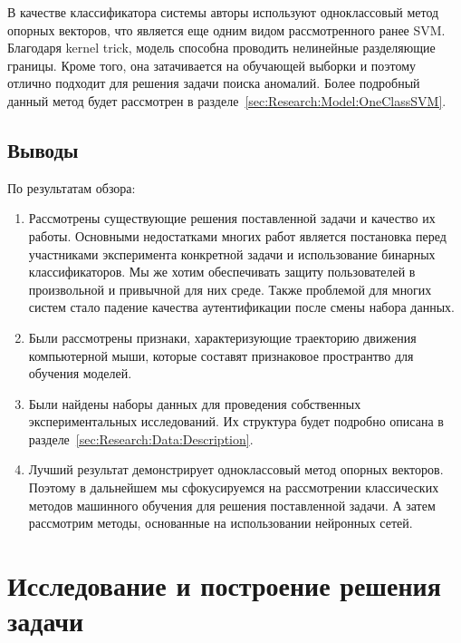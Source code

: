 \documentclass[12pt]{article}
\begin{document}
    \par В качестве классификатора системы авторы используют одноклассовый метод опорных векторов, что является еще одним видом рассмотренного ранее SVM. Благодаря kernel trick, модель способна проводить нелинейные разделяющие границы. Кроме того, она затачивается на обучающей выборки и поэтому отлично подходит для решения задачи поиска аномалий. Более подробный данный метод будет рассмотрен в разделе~\ref{sec:Research:Model:OneClassSVM}.

    \subsection{Выводы}
    \label{sec:Overview:Conclusions}

    \par По результатам обзора:

    \begin{enumerate}
        \item Рассмотрены существующие решения поставленной задачи и качество их работы. Основными недостатками многих работ является постановка перед участниками эксперимента конкретной задачи и использование бинарных классификаторов. Мы же хотим обеспечивать защиту пользователей в произвольной и привычной для них среде. Также проблемой для многих систем стало падение качества аутентификации после смены набора данных.
        \item Были рассмотрены признаки, характеризующие траекторию движения компьютерной мыши, которые составят признаковое пространтво для обучения моделей.
        \item Были найдены наборы данных для проведения собственных экспериментальных исследований. Их структура будет подробно описана в разделе~\ref{sec:Research:Data:Description}.
        \item Лучший результат демонстрирует одноклассовый метод опорных векторов. Поэтому в дальнейшем мы сфокусируемся на рассмотрении классических методов машинного обучения для решения поставленной задачи. А затем рассмотрим методы, основанные на использовании нейронных сетей.
    \end{enumerate}

    \newpage



    \section{Исследование и построение решения задачи}
    \label{sec:Research}
\end{document}
